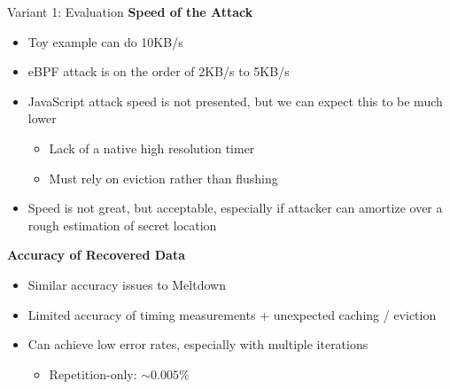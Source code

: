 \documentclass[10pt, dvipsnames, aspectratio=169]{beamer}
\begin{document}
\begin{frame}[c, fragile]{Variant 1: Evaluation}{}
  {\bf Speed of the Attack}
  \begin{itemize}
    \item Toy example can do 10KB/s
    \item eBPF attack is on the order of 2KB/s to 5KB/s
    \item JavaScript attack speed is not presented, but we can expect this to be much lower
    \begin{itemize}
      \item Lack of a native high resolution timer
      \item Must rely on eviction rather than flushing
    \end{itemize}
    \item Speed is not great, but acceptable, especially if attacker can amortize over a rough estimation of secret location
  \end{itemize}

  \vfill
  {\bf Accuracy of Recovered Data}
  \begin{itemize}
    \item Similar accuracy issues to Meltdown
    \item Limited accuracy of timing measurements + unexpected caching / eviction
    \item Can achieve low error rates, especially with multiple iterations
    \begin{itemize}
      \item Repetition-only: $\sim0.005\%$
    \end{itemize}
  \end{itemize}
\end{frame}
\end{document}
